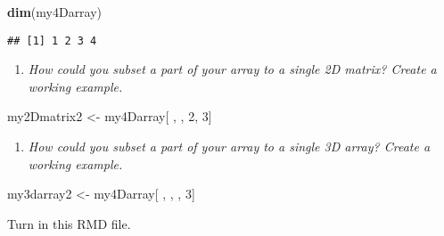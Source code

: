 \documentclass[
]{article}
\newenvironment{Shaded}{\begin{snugshade}}{\end{snugshade}}
\newcommand{\DecValTok}[1]{\textcolor[rgb]{0.00,0.00,0.81}{#1}}
\newcommand{\FunctionTok}[1]{\textcolor[rgb]{0.13,0.29,0.53}{\textbf{#1}}}
\newcommand{\NormalTok}[1]{#1}
\newcommand{\OtherTok}[1]{\textcolor[rgb]{0.56,0.35,0.01}{#1}}
\providecommand{\tightlist}{%
  \setlength{\itemsep}{0pt}\setlength{\parskip}{0pt}}
\begin{document}
\begin{Shaded}
\begin{Highlighting}[]
\FunctionTok{dim}\NormalTok{(my4Darray)}
\end{Highlighting}
\end{Shaded}

\begin{verbatim}
## [1] 1 2 3 4
\end{verbatim}

\begin{enumerate}
\def\labelenumi{\alph{enumi}.}
\setcounter{enumi}{1}
\tightlist
\item
  \emph{How could you subset a part of your array to a single 2D matrix?
  Create a working example.}
\end{enumerate}

\begin{Shaded}
\begin{Highlighting}[]
\NormalTok{my2Dmatrix2 }\OtherTok{\textless{}{-}}\NormalTok{ my4Darray[ , , }\DecValTok{2}\NormalTok{, }\DecValTok{3}\NormalTok{]}
\end{Highlighting}
\end{Shaded}

\begin{enumerate}
\def\labelenumi{\alph{enumi}.}
\setcounter{enumi}{2}
\tightlist
\item
  \emph{How could you subset a part of your array to a single 3D array?
  Create a working example.}
\end{enumerate}

\begin{Shaded}
\begin{Highlighting}[]
\NormalTok{my3darray2 }\OtherTok{\textless{}{-}}\NormalTok{ my4Darray[ , , , }\DecValTok{3}\NormalTok{]}
\end{Highlighting}
\end{Shaded}

Turn in this RMD file.
\end{document}
